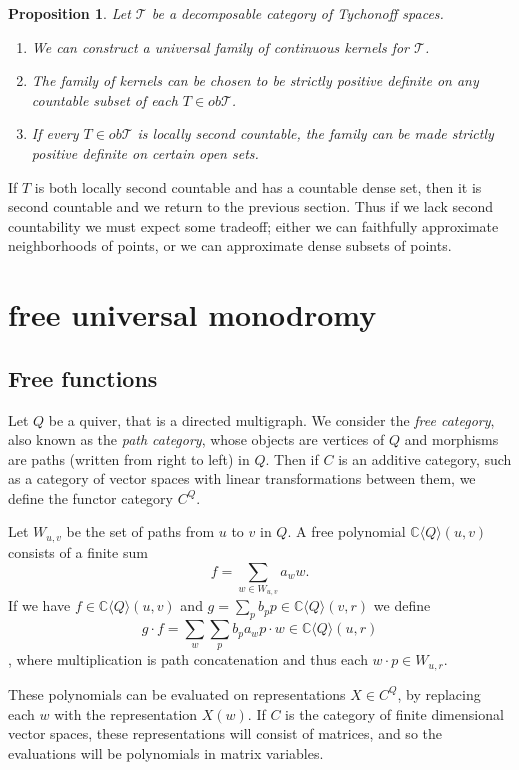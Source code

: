 \documentclass[12pt]{amsart}
\newtheorem{proposition}[theorem]{Proposition}
\theoremstyle{definition}
\numberwithin{equation}{section}
\begin{document}
\begin{proposition}
    Let $\mathcal T$ be a decomposable category of Tychonoff spaces. 
    \begin{enumerate}
        \item We can construct a universal family of continuous kernels for $\mathcal T$. 
        \item The family of kernels can be chosen to be strictly positive definite on any countable subset of each $T\in ob\mathcal T$. 
        \item If every $T\in ob\mathcal T$ is locally second countable, the family can be made strictly positive definite on certain open sets.  
    \end{enumerate}
\end{proposition}


If $T$ is both locally second countable and has a countable dense set, then it is second countable and we return to the previous section. Thus if we lack second countability we must expect some tradeoff; either we can faithfully approximate neighborhoods of points, or we can approximate dense subsets of points.


\section{free universal monodromy}
\subsection{Free functions}
Let $Q$ be a quiver, that is a directed multigraph. We consider the \textit{free category}, also known as the \textit{path category}, whose objects are vertices of $Q$ and morphisms are paths (written from right to left) in $Q$. Then if $C$ is an additive category, such as a category of vector spaces with linear transformations between them, we define the functor category $C^Q.$ 

Let $W_{u,v}$ be the set of paths from $u$ to $v$ in $Q$. A free polynomial $\mathbb C\langle Q\rangle(u,v)$ consists of a finite sum \[f= \sum_{w\in W_{u,v}}a_ww.\] If we have $f \in \mathbb C\langle Q\rangle(u,v)$ and $g = \sum_pb_pp \in \mathbb C\langle Q\rangle(v,r)$ we define \[g\cdot f = \sum_w\sum_pb_pa_wp\cdot w \in \mathbb C\langle Q\rangle(u,r)\], where multiplication is path concatenation and thus each $w\cdot p \in W_{u,r}$. 

These polynomials can be evaluated on representations $X \in C^Q$, by replacing each $w$ with the representation $X(w)$. If $C$ is the category of finite dimensional vector spaces, these representations will consist of matrices, and so the evaluations will be polynomials in matrix variables. 
\end{document}

